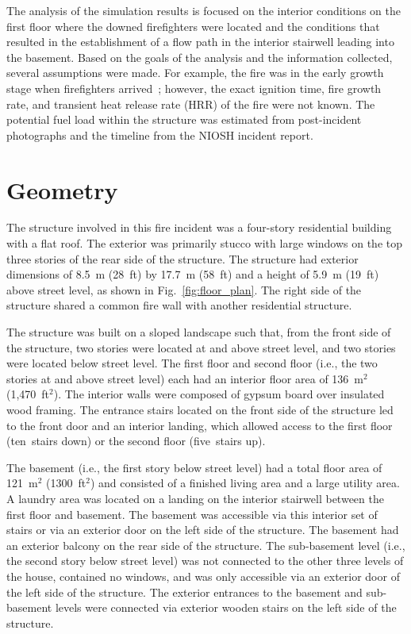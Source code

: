 \documentclass[12pt,oneside]{book}
\begin{document}
\clearpage


The analysis of the simulation results is focused on the interior conditions on the first floor where the downed firefighters were located and the conditions that resulted in the establishment of a flow path in the interior stairwell leading into the basement. Based on the goals of the analysis and the information collected, several assumptions were made. For example, the fire was in the early growth stage when firefighters arrived~\cite{NIOSH:Bowyer2}; however, the exact ignition time, fire growth rate, and transient heat release rate (HRR) of the fire were not known. The potential fuel load within the structure was estimated from post-incident photographs and the timeline from the NIOSH incident report.

\section{Geometry}
\label{sec:geometry}

The structure involved in this fire incident was a four-story residential building with a flat roof. The exterior was primarily stucco with large windows on the top three stories of the rear side of the structure. The structure had exterior dimensions of 8.5~m (28~ft) by 17.7~m (58~ft) and a height of 5.9~m (19~ft) above street level, as shown in Fig.~\ref{fig:floor_plan}. The right side of the structure shared a common fire wall with another residential structure.

The structure was built on a sloped landscape such that, from the front side of the structure, two stories were located at and above street level, and two stories were located below street level. The first floor and second floor (i.e., the two stories at and above street level) each had an interior floor area of 136~m$^2$ (1,470~ft$^2$). The interior walls were composed of gypsum board over insulated wood framing. The entrance stairs located on the front side of the structure led to the front door and an interior landing, which allowed access to the first floor (ten~stairs down) or the second floor (five~stairs up).

The basement (i.e., the first story below street level) had a total floor area of 121~m$^2$ (1300~ft$^2$) and consisted of a finished living area and a large utility area. A laundry area was located on a landing on the interior stairwell between the first floor and basement. The basement was accessible via this interior set of stairs or via an exterior door on the left side of the structure. The basement had an exterior balcony on the rear side of the structure. The sub-basement level (i.e., the second story below street level) was not connected to the other three levels of the house, contained no windows, and was only accessible via an exterior door of the left side of the structure. The exterior entrances to the basement and sub-basement levels were connected via exterior wooden stairs on the left side of the structure.
\end{document}
